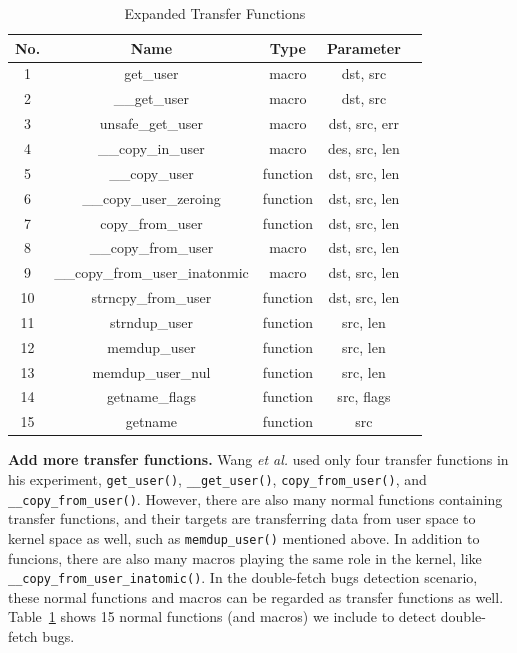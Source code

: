 \documentclass[10pt]{llncs}
\begin{document}
\begin{table}[t!]
\caption{Expanded Transfer Functions}
\centering
\begin{tabular}{ccccc} 
  \hline
  \textbf{No.} & \textbf{Name} & \textbf{Type} & \textbf{Parameter} \\
  \hline
  1 & get\_user & macro & dst, src \\
  2 & \_\_get\_user & macro & dst, src \\
  3 & unsafe\_get\_user & macro & dst, src, err \\
  4 & \_\_copy\_in\_user & macro & des, src, len \\
  5 & \_\_copy\_user & function & dst, src, len \\
  6 & \_\_copy\_user\_zeroing & function & dst, src, len \\
  7 & copy\_from\_user & function & dst, src, len \\
  8 & \_\_copy\_from\_user & macro & dst, src, len \\
  9 & \_\_copy\_from\_user\_inatonmic & macro & dst, src, len \\
  10 & strncpy\_from\_user & function & dst, src, len \\
  11 & strndup\_user & function & src, len \\
  12 & memdup\_user & function & src, len \\
  13 & memdup\_user\_nul & function & src, len \\
  14 & getname\_flags & function & src, flags \\
  15 & getname & function & src \\
  \hline
\end{tabular}
\label{transfer-func}
\end{table}


\textbf{Add more transfer functions.} Wang \textit{et al.} used only four transfer functions in his experiment, \verb:get_user():, \verb:__get_user():, \verb:copy_from_user():, and \verb:__copy_from_user():. However, there are also many normal functions containing transfer functions, and their targets are transferring data from user space to kernel space as well, such as \verb:memdup_user(): mentioned above. In addition to funcions, there are also many macros playing the same role in the kernel, like \verb:__copy_from_user_inatomic():.
In the double-fetch bugs detection scenario, these normal functions and macros can be regarded as transfer functions as well. Table~\ref{transfer-func} shows 15 normal functions (and macros) we include to detect double-fetch bugs.%
\end{document}
